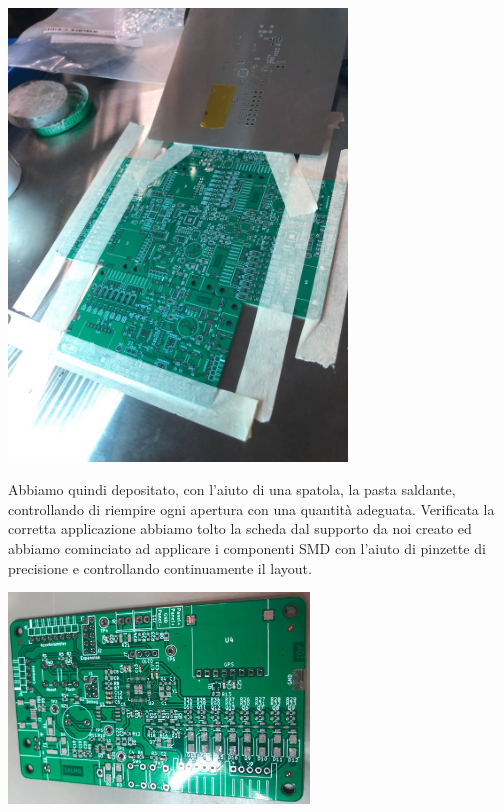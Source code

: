 \begin{center}
    \includegraphics[width=9cm]{figures/image106.jpg}
    \captionsetup{type=figure}
\end{center}

\noindent Abbiamo quindi depositato, con l’aiuto di una spatola, la pasta saldante, controllando di riempire ogni apertura con una quantità adeguata. Verificata la corretta applicazione abbiamo tolto la scheda dal supporto da noi creato ed abbiamo cominciato ad applicare i componenti SMD con l’aiuto di pinzette di precisione e controllando continuamente il layout.

\begin{center}
    \includegraphics[width=0.6\textwidth]{figures/image107.jpg}
    \captionsetup{type=figure}
\end{center}

